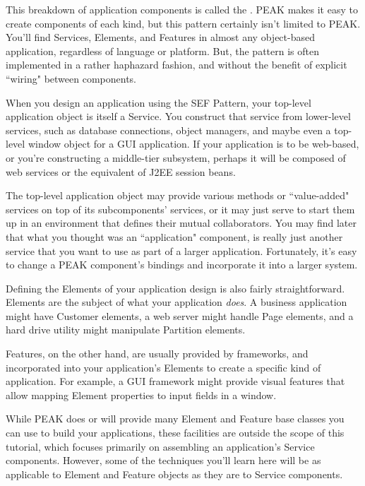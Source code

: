 This breakdown of application components is called the
.  PEAK makes it easy to create
components of each kind, but this pattern certainly isn't limited to PEAK.
You'll find Services, Elements, and Features in almost any object-based
application, regardless of language or platform.  But, the pattern is often
implemented in a rather haphazard fashion, and without the benefit of explicit
``wiring" between components.

When you design an application using the SEF Pattern, your top-level
application object is itself a Service.  You construct that service from
lower-level services, such as database connections, object managers,
and maybe even a top-level window object for a GUI application.  If your
application is to be web-based, or you're constructing a middle-tier
subsystem, perhaps it will be composed of web services or the equivalent
of J2EE session beans.

The top-level application object may provide various methods or ``value-added"
services on top of its subcomponents' services, or it may just serve to start
them up in an environment that defines their mutual collaborators.  You may
find later that what you thought was an ``application" component, is really
just another service that you want to use as part of a larger application.
Fortunately, it's easy to change a PEAK component's bindings and
incorporate it into a larger system.

Defining the Elements of your application design is also fairly
straightforward.  Elements are the subject of what your application
\emph{does}.  A business application might have Customer elements, a web
server might handle Page elements, and a hard drive utility might manipulate
Partition elements.

Features, on the other hand, are usually provided by frameworks, and
incorporated into your application's Elements to create a specific kind of
application.  For example, a GUI framework might provide visual features that
allow mapping Element properties to input fields in a window.

While PEAK does or will provide many Element and Feature base classes you can
use to build your applications, these facilities are outside the scope of
this tutorial, which focuses primarily on assembling an application's Service
components.  However, some of the techniques you'll learn here will be as
applicable to Element and Feature objects as they are to Service components.

